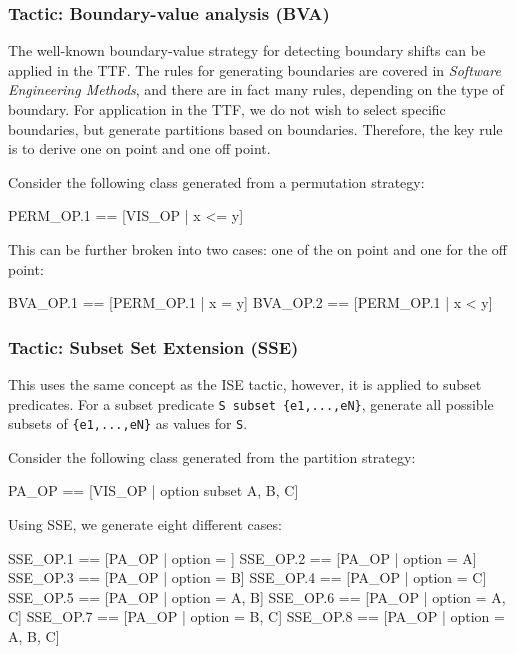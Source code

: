 \subsubsection{Tactic: Boundary-value analysis (BVA)}

The well-known boundary-value strategy for detecting boundary shifts can be applied in the TTF. The rules for generating boundaries are covered in \emph{Software Engineering Methods}, and there are in fact many rules, depending on the type of boundary. For application in the TTF, we do not wish to select specific boundaries, but generate partitions based on boundaries. Therefore, the key rule is to derive one on point and one off point.

\begin{example}
Consider the following class generated from a permutation strategy:

\lstset{aboveskip=3mm}
\lstset{language=}
\begin{alloy}
 PERM_OP.1 == [VIS_OP | x <= y]
\end{alloy}

 This can be further broken into two cases: one of the on point and one for the off point:

\lstset{aboveskip=3mm}
\lstset{language=}
\begin{alloy}
 BVA_OP.1 == [PERM_OP.1 | x = y]
 BVA_OP.2 == [PERM_OP.1 | x < y]
\end{alloy}
\end{example}

\subsubsection{Tactic: Subset Set Extension (SSE)} 

This uses the same concept as the ISE tactic, however, it is applied to subset predicates. For a subset predicate \verb+S subset {e1,...,eN}+, generate all possible subsets of \verb+{e1,...,eN}+ as values for \texttt{S}.

\begin{example}
Consider the following class generated from the partition strategy:

\lstset{aboveskip=3mm}
\lstset{language=}
\begin{alloy}
 PA_OP == [VIS_OP | option subset {A, B, C}]
\end{alloy}

Using SSE, we generate eight different cases:

\lstset{aboveskip=3mm}
\lstset{language=}
\begin{alloy}
 SSE_OP.1 == [PA_OP | option = {}]
 SSE_OP.2 == [PA_OP | option = {A}]
 SSE_OP.3 == [PA_OP | option = {B}]
 SSE_OP.4 == [PA_OP | option = {C}]
 SSE_OP.5 == [PA_OP | option = {A, B}]
 SSE_OP.6 == [PA_OP | option = {A, C}]
 SSE_OP.7 == [PA_OP | option = {B, C}]
 SSE_OP.8 == [PA_OP | option = {A, B, C}]
\end{alloy}
\end{example}

